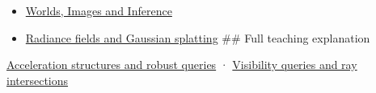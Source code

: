 \begin{itemize}
\item
  \href{Continuous\%20Notes/University\%20-\%20Worlds,\%20Images\%20and\%20Inference\%20-\%20Graphics,\%20Vision\%20and\%20Photography}{Worlds, Images and Inference}
\item
  \hyperref[appendix-c5b332e400e7]{Radiance fields and Gaussian splatting} \#\# Full teaching explanation
\end{itemize}

\hyperref[04-visual-computing-ii-ch029-acceleration-structures-and-robust-queries]{Acceleration structures and robust queries} · \hyperref[04-visual-computing-ii-ch028-visibility-queries-and-ray-intersections]{Visibility queries and ray intersections}
